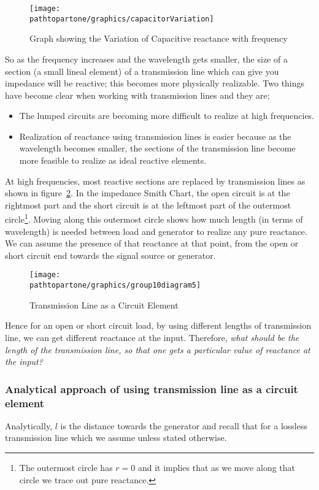 \begin{figure}[ht]
	\centering
	\texttt{[image: \\pathtopartone/graphics/capacitorVariation]}
	\caption{Graph showing the Variation of Capacitive reactance with frequency}
	\label{fig:capacitorVariation}
\end{figure}

So as the frequency increases and the wavelength gets smaller, the size of a section (a small lineal element) of a transmission line which can give you impedance will be reactive; this becomes more physically realizable. Two things have become clear when working with transmission
lines and they are;
\begin{itemize}
	\item The lumped circuits are becoming more difficult to realize at high frequencies.
	\item Realization of reactance using transmission lines is easier because as the wavelength becomes smaller, the sections of the transmission line become more feasible to realize as ideal reactive elements.
\end{itemize}
At high frequencies, most reactive sections are replaced by transmission lines as shown in figure~\ref{fig:group10diagram5}. In the impedance Smith Chart, the open circuit is at the rightmost part and the short circuit is at the leftmost part of the outermost circle\footnote{
	The outermost circle has $r = 0$ and it implies that as we move along that circle we trace out pure reactance.
}. Moving along this outermost circle shows how much length (in terms of wavelength) is needed between load and generator to realize any pure reactance. We can assume the presence of that reactance at that point, from the open or short circuit end towards the signal source or generator.
\begin{figure}[ht]
	\centering
	\texttt{[image: \\pathtopartone/graphics/group10diagram5]}
	\caption{Transmission Line as a Circuit Element}
	\label{fig:group10diagram5}
\end{figure}

Hence for an open or short circuit load, by using different lengths of transmission line, we can get different reactance at the input. Therefore, \emph{what should be the length of the transmission line, so that one gets a particular value of reactance at the input?}

\subsubsection{Analytical approach of using transmission line as a circuit element}
Analytically, $l$ is the distance towards the generator and recall that for a lossless transmission line which we assume unless stated otherwise.

